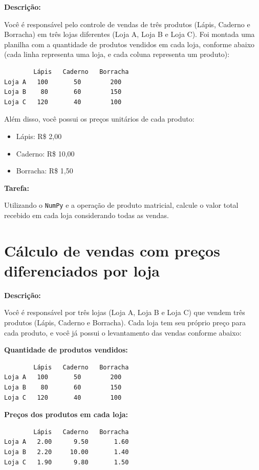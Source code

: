 \textbf{Descrição:}

Você é responsável pelo controle de vendas de três produtos (Lápis, Caderno e Borracha) em três lojas diferentes (Loja A, Loja B e Loja C). Foi montada uma planilha com a quantidade de produtos vendidos em cada loja, conforme abaixo (cada linha representa uma loja, e cada coluna representa um produto):

\begin{verbatim}
        Lápis   Caderno   Borracha
Loja A   100       50        200
Loja B    80       60        150
Loja C   120       40        100
\end{verbatim}

Além disso, você possui os preços unitários de cada produto:

\begin{itemize}
    \item Lápis: R\$ 2,00
    \item Caderno: R\$ 10,00
    \item Borracha: R\$ 1,50
\end{itemize}

\textbf{Tarefa:}

Utilizando o \texttt{NumPy} e a operação de produto matricial, calcule o valor total recebido em cada loja considerando todas as vendas.


\section{Cálculo de vendas com preços diferenciados por loja}

\textbf{Descrição:}

Você é responsável por três lojas (Loja A, Loja B e Loja C) que vendem três produtos (Lápis, Caderno e Borracha). Cada loja tem seu próprio preço para cada produto, e você já possui o levantamento das vendas conforme abaixo:

\textbf{Quantidade de produtos vendidos:}

\begin{verbatim}
        Lápis   Caderno   Borracha
Loja A   100       50        200
Loja B    80       60        150
Loja C   120       40        100
\end{verbatim}

\textbf{Preços dos produtos em cada loja:}

\begin{verbatim}
        Lápis   Caderno   Borracha
Loja A   2.00      9.50       1.60
Loja B   2.20     10.00       1.40
Loja C   1.90      9.80       1.50
\end{verbatim}

